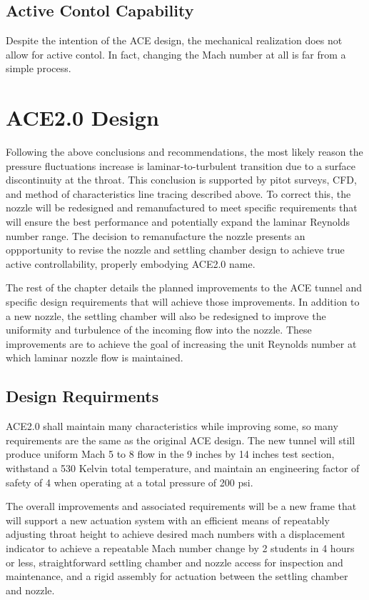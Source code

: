 \subsection{Active Contol Capability}

Despite the intention of the ACE design, the mechanical realization does not allow for active contol. In fact, changing the Mach number at all is far from a simple process. 

\section{ACE2.0 Design}

Following the above conclusions and recommendations, the most likely reason the pressure fluctuations increase is laminar-to-turbulent transition due to a surface discontinuity at the throat. This conclusion is supported by pitot surveys, CFD, and method of characteristics line tracing described above. To correct this, the nozzle will be redesigned and remanufactured to meet specific requirements that will ensure the best performance and potentially expand the laminar Reynolds number range. The decision to remanufacture the nozzle presents an oppportunity to revise the nozzle and settling chamber design to achieve true active controllability, properly embodying ACE2.0 name.

The rest of the chapter details the planned improvements to the ACE tunnel and specific design requirements that will achieve those improvements. In addition to a new nozzle, the settling chamber will also be redesigned to improve the uniformity and turbulence of the incoming flow into the nozzle. These improvements are to achieve the goal of increasing the unit Reynolds number at which laminar nozzle flow is maintained.

\subsection{Design Requirments}

ACE2.0 shall maintain many characteristics while improving some, so many requirements are the same as the original ACE design. The new tunnel will still produce uniform Mach 5 to 8 flow in the 9 inches by 14 inches test section, withstand a 530 Kelvin total temperature, and maintain an engineering factor of safety of 4 when operating at a total pressure of 200 psi.

The overall improvements and associated requirements will be a new frame that will support a new actuation system with an efficient means of repeatably adjusting throat height to achieve desired mach numbers with a displacement indicator to achieve a repeatable Mach number change by 2 students in 4 hours or less, straightforward settling chamber and nozzle access for inspection and maintenance, and a rigid assembly for actuation between the settling chamber and nozzle.

